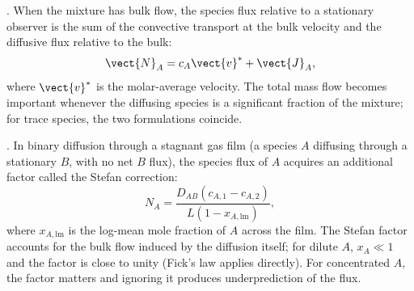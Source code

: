 

. When the mixture has bulk
flow, the species flux relative to a stationary observer is the sum
of the convective transport at the bulk velocity and the diffusive
flux relative to the bulk:
\[
\vect{N}_A = c_A \vect{v}^* + \vect{J}_A,
\]
where $\vect{v}^*$ is the molar-average velocity. The total mass flow
becomes important whenever the diffusing species is a significant
fraction of the mixture; for trace species, the two formulations
coincide.

. In binary diffusion through a stagnant gas
film (a species $A$ diffusing through a stationary $B$, with no net
$B$ flux), the species flux of $A$ acquires an additional factor
called the Stefan correction:
\[
N_A = \frac{D_{AB} (c_{A,1} - c_{A,2})}{L (1 - x_{A,\text{lm}})},
\]
where $x_{A,\text{lm}}$ is the log-mean mole fraction of $A$ across
the film. The Stefan factor accounts for the bulk flow induced by
the diffusion itself; for dilute $A$, $x_A \ll 1$ and the factor is
close to unity (Fick's law applies directly). For concentrated $A$,
the factor matters and ignoring it produces underprediction of the
flux.

